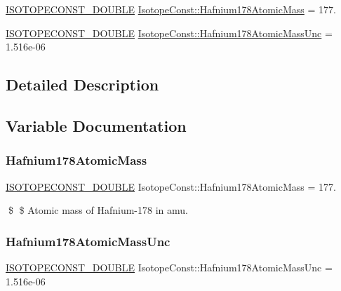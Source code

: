 \begin{DoxyCompactItemize}
\item 
\mbox{\hyperlink{group___isotope_const-_macros_ga8f45a7272ce02c0b4c65c44636ed719a}{I\+S\+O\+T\+O\+P\+E\+C\+O\+N\+S\+T\+\_\+\+D\+O\+U\+B\+LE}} \mbox{\hyperlink{group___isotope_const-_hafnium-_hf178_gafadb68d496bbe1dddbecce59613556ab}{Isotope\+Const\+::\+Hafnium178\+Atomic\+Mass}} = 177.
\item 
\mbox{\hyperlink{group___isotope_const-_macros_ga8f45a7272ce02c0b4c65c44636ed719a}{I\+S\+O\+T\+O\+P\+E\+C\+O\+N\+S\+T\+\_\+\+D\+O\+U\+B\+LE}} \mbox{\hyperlink{group___isotope_const-_hafnium-_hf178_ga6669aa091dc8bee17707f67cbb49c407}{Isotope\+Const\+::\+Hafnium178\+Atomic\+Mass\+Unc}} = 1.\+516e-\/06
\end{DoxyCompactItemize}


\subsection{Detailed Description}


\subsection{Variable Documentation}
\mbox{\label{group___isotope_const-_hafnium-_hf178_gafadb68d496bbe1dddbecce59613556ab}} 
\subsubsection{\texorpdfstring{Hafnium178\+Atomic\+Mass}{Hafnium178AtomicMass}}
{\footnotesize\ttfamily \mbox{\hyperlink{group___isotope_const-_macros_ga8f45a7272ce02c0b4c65c44636ed719a}{I\+S\+O\+T\+O\+P\+E\+C\+O\+N\+S\+T\+\_\+\+D\+O\+U\+B\+LE}} Isotope\+Const\+::\+Hafnium178\+Atomic\+Mass = 177.}

\$ \$ Atomic mass of Hafnium-\/178 in amu. \mbox{\label{group___isotope_const-_hafnium-_hf178_ga6669aa091dc8bee17707f67cbb49c407}} 
\subsubsection{\texorpdfstring{Hafnium178\+Atomic\+Mass\+Unc}{Hafnium178AtomicMassUnc}}
{\footnotesize\ttfamily \mbox{\hyperlink{group___isotope_const-_macros_ga8f45a7272ce02c0b4c65c44636ed719a}{I\+S\+O\+T\+O\+P\+E\+C\+O\+N\+S\+T\+\_\+\+D\+O\+U\+B\+LE}} Isotope\+Const\+::\+Hafnium178\+Atomic\+Mass\+Unc = 1.\+516e-\/06}

